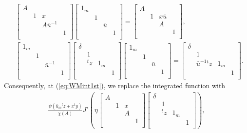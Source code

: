 \documentclass[11pt]{amsart}
\newcommand\1{\mathbf{1}}
\newcommand\bu{\bar{u}}
\numberwithin{equation}{section}
\begin{document}
\begin{align*}
& \begin{bmatrix}
A & & &  \\
& 1 & x  & \\
&  &A \bu^{-1} &  \\
& & &1  \\
\end{bmatrix}
\begin{bmatrix}
1_m & & &  \\
& 1& & \\
& &\bu &  \\
& &  &1  \\
\end{bmatrix} = \begin{bmatrix}
A & & &  \\
& 1 & x \bu  & \\
&  &A &  \\
& & &1  \\
\end{bmatrix}, \\
& \begin{bmatrix}
1_m & & &  \\
& 1& & \\
& &\bu^{-1} &  \\
& &  &1  \\
\end{bmatrix} \begin{bmatrix}
\delta & & &  \\
& 1& & \\
& {}^tz &1_m &  \\
& &  &1  \\
\end{bmatrix}
\begin{bmatrix}
1_m & & &  \\
& 1& & \\
& &\bu &  \\
& &  &1  \\
\end{bmatrix} = 
\begin{bmatrix}
\delta & & &  \\
& 1& & \\
& \bu^{-1}{}^tz &1_m &  \\
& &  &1  \\
\end{bmatrix}.
\end{align*} 
Consequently, at (\ref{eq:WMint1st}), we replace the integrated function with 
\begin{align} 
\frac{\psi(\bu_m{}^tz + x{}^ty)}{\chi(A)} J'(\eta \begin{bmatrix}
A & & &  \\
& 1 & x & \\
&  &A  &  \\
& & &1  \\
\end{bmatrix}
\begin{bmatrix}
\delta & & &  \\
& 1& & \\
& {}^tz  &1_m &  \\
& &  &1  \\
\end{bmatrix}), \label{eq:1stthl}
\end{align} 
\end{document}
